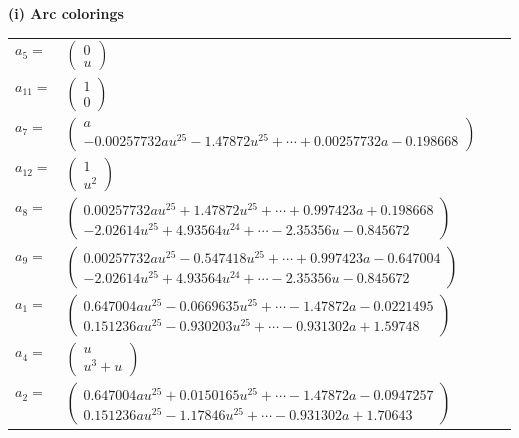 \documentclass[1p]{elsarticle_modified}
\theoremstyle{definition}
\begin{document}
\flushleft \textbf{(i) Arc colorings}\\
\begin{tabular}{m{7pt} m{180pt} m{7pt} m{180pt} }
\flushright $a_{5}=$&$\begin{pmatrix}0\\u\end{pmatrix}$ \\
\flushright $a_{11}=$&$\begin{pmatrix}1\\0\end{pmatrix}$ \\
\flushright $a_{7}=$&$\begin{pmatrix}a\\-0.00257732 a u^{25}-1.47872 u^{25}+\cdots+0.00257732 a-0.198668\end{pmatrix}$ \\
\flushright $a_{12}=$&$\begin{pmatrix}1\\u^2\end{pmatrix}$ \\
\flushright $a_{8}=$&$\begin{pmatrix}0.00257732 a u^{25}+1.47872 u^{25}+\cdots+0.997423 a+0.198668\\-2.02614 u^{25}+4.93564 u^{24}+\cdots-2.35356 u-0.845672\end{pmatrix}$ \\
\flushright $a_{9}=$&$\begin{pmatrix}0.00257732 a u^{25}-0.547418 u^{25}+\cdots+0.997423 a-0.647004\\-2.02614 u^{25}+4.93564 u^{24}+\cdots-2.35356 u-0.845672\end{pmatrix}$ \\
\flushright $a_{1}=$&$\begin{pmatrix}0.647004 a u^{25}-0.0669635 u^{25}+\cdots-1.47872 a-0.0221495\\0.151236 a u^{25}-0.930203 u^{25}+\cdots-0.931302 a+1.59748\end{pmatrix}$ \\
\flushright $a_{4}=$&$\begin{pmatrix}u\\u^3+u\end{pmatrix}$ \\
\flushright $a_{2}=$&$\begin{pmatrix}0.647004 a u^{25}+0.0150165 u^{25}+\cdots-1.47872 a-0.0947257\\0.151236 a u^{25}-1.17846 u^{25}+\cdots-0.931302 a+1.70643\end{pmatrix}$ \\

\end{tabular}
\end{document}
